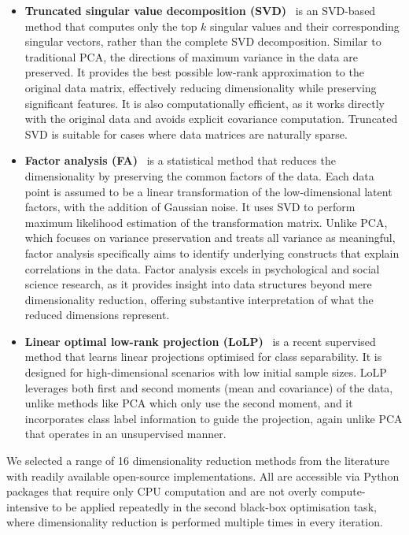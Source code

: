 \begin{itemize}
    \item \textbf{Truncated singular value decomposition (SVD)}~\citep{HalEtAl11} is an SVD-based method that computes only the top $k$ singular values and their corresponding singular vectors, rather than the complete SVD decomposition. Similar to traditional PCA, the directions of maximum variance in the data are preserved. It provides the best possible low-rank approximation to the original data matrix, effectively reducing dimensionality while preserving significant features. It is also computationally efficient, as it works directly with the original data and avoids explicit covariance computation. Truncated SVD is suitable for cases where data matrices are naturally sparse.
    \item \textbf{Factor analysis (FA)}~\citep{Barber12} is a statistical method that reduces the dimensionality by preserving the common factors of the data. Each data point is assumed to be a linear transformation of the low-dimensional latent factors, with the addition of Gaussian noise. It uses SVD to perform maximum likelihood estimation of the transformation matrix. Unlike PCA, which focuses on variance preservation and treats all variance as meaningful, factor analysis specifically aims to identify underlying constructs that explain correlations in the data. Factor analysis excels in psychological and social science research, as it provides insight into data structures beyond mere dimensionality reduction, offering substantive interpretation of what the reduced dimensions represent.

    \item \textbf{Linear optimal low-rank projection (LoLP)}~\citep{VogEtAl21} is a recent supervised method that learns linear projections optimised for class separability. It is designed for high-dimensional scenarios with low initial sample sizes. LoLP leverages both first and second moments (mean and covariance) of the data, unlike methods like PCA which only use the second moment, and it incorporates class label information to guide the projection, again unlike PCA that operates in an unsupervised manner.


\end{itemize}










We selected a range of 16 dimensionality reduction methods from the literature with readily available open-source implementations. 
All are accessible via Python packages that require only CPU computation and are not overly compute-intensive to be applied repeatedly in the second black-box optimisation task, where dimensionality reduction is performed multiple times in every iteration.


